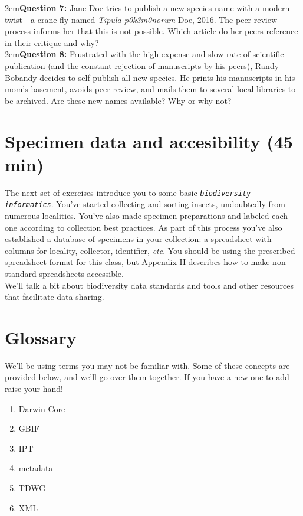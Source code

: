 \documentclass[letterpaper, 11pt]{article}
\newcommand{\latinword}[1]{\texttt{\itshape #1}}%
\begin{document}
\hangindent2em\textbf{Question 7:} Jane Doe tries to publish a new species name with a modern twist---a crane fly named \textit{Tipula p0k3m0norum} Doe, 2016. The peer review process informs her that this is not possible. Which article do her peers reference in their critique and why?\\

\hangindent2em\textbf{Question 8:} Frustrated with the high expense and slow rate of scientific publication (and the constant rejection of manuscripts by his peers), Randy Bobandy decides to self-publish all new species. He prints his manuscripts in his mom's basement, avoids peer-review, and mails them to several local libraries to be archived. Are these new names available? Why or why not?\\

\section{Specimen data and accesibility (45 min)}

The next set of exercises introduce you to some basic \latinword{biodiversity informatics}. You've started collecting and sorting insects, undoubtedly from numerous localities. You've also made specimen preparations and labeled each one according to collection best practices. As part of this process you've also established a database of specimens in your collection: a spreadsheet with columns for locality, collector, identifier, \textit{etc}. You should be using the prescribed spreadsheet format for this class, but Appendix II describes how to make non-standard spreadsheets accessible.\\

\noindent{}We'll talk a bit about biodiversity data standards and tools and other resources that facilitate data sharing. 

\section*{Glossary}
We'll be using terms you may not be familiar with. Some of these concepts are provided below, and we'll go over them together. If you have a new one to add raise your hand!
\begin{enumerate} 
\item {Darwin Core}
\item {GBIF}
\item {IPT}
\item {metadata}
\item{TDWG} 
\item{XML}  
\end{enumerate}
\end{document}
